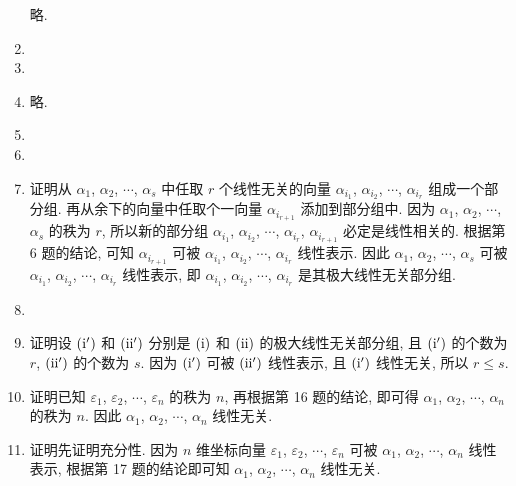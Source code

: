 \documentclass[a4paper, 11pt]{ctexart}
\begin{document}
\begin{enumerate}
            略.
        \item %
        \item %
        \item %
            略.
        \item %
        \item %
        \item %
            {\heiti 证明}\quad 从 $\alpha_1$, $\alpha_2$, $\cdots$, $\alpha_s$ 中任取 $r$ 个线性无关的向量 $\alpha_{i_1}$, $\alpha_{i_2}$, $\cdots$, $\alpha_{i_r}$ 组成一个部分组.
            再从余下的向量中任取个一向量 $\alpha_{i_{r+1}}$ 添加到部分组中. 因为 $\alpha_1$, $\alpha_2$, $\cdots$, $\alpha_s$ 的秩为 $r$, 所以新的部分组 $\alpha_{i_1}$, $\alpha_{i_2}$, $\cdots$, $\alpha_{i_r}$, $\alpha_{i_{r+1}}$ 必定是线性相关的.
            根据{\heiti 第 6 题}的结论, 可知 $\alpha_{i_{r+1}}$ 可被 $\alpha_{i_1}$, $\alpha_{i_2}$, $\cdots$, $\alpha_{i_r}$ 线性表示.
            因此 $\alpha_1$, $\alpha_2$, $\cdots$, $\alpha_s$ 可被 $\alpha_{i_1}$, $\alpha_{i_2}$, $\cdots$, $\alpha_{i_r}$ 线性表示, 即 $\alpha_{i_1}$, $\alpha_{i_2}$, $\cdots$, $\alpha_{i_r}$ 是其极大线性无关部分组.
        \item %
        \item %
            {\heiti 证明}\quad 设 $(\mathrm{\uppercase\expandafter{\romannumeral1'}})$ 和 $(\mathrm{\uppercase\expandafter{\romannumeral2'}})$ 分别是 $(\mathrm{\uppercase\expandafter{\romannumeral1}})$ 和 $(\mathrm{\uppercase\expandafter{\romannumeral2}})$ 的极大线性无关部分组, 且 $(\mathrm{\uppercase\expandafter{\romannumeral1'}})$ 的个数为 $r$, $(\mathrm{\uppercase\expandafter{\romannumeral2'}})$ 的个数为 $s$.
            因为 $(\mathrm{\uppercase\expandafter{\romannumeral1'}})$ 可被 $(\mathrm{\uppercase\expandafter{\romannumeral2'}})$ 线性表示, 且 $(\mathrm{\uppercase\expandafter{\romannumeral1'}})$ 线性无关, 所以 $r \leqslant s$. 
        \item %
            {\heiti 证明}\quad 已知 $\varepsilon_1$, $\varepsilon_2$, $\cdots$, $\varepsilon_n$ 的秩为 $n$, 再根据{\heiti 第 16 题}的结论, 即可得 $\alpha_1$, $\alpha_2$, $\cdots$, $\alpha_n$ 的秩为 $n$.
            因此 $\alpha_1$, $\alpha_2$, $\cdots$, $\alpha_n$ 线性无关.
        \item %
            {\heiti 证明}\quad 先证明充分性. 因为 $n$ 维坐标向量 $\varepsilon_1$, $\varepsilon_2$, $\cdots$, $\varepsilon_n$ 可被 $\alpha_1$, $\alpha_2$, $\cdots$, $\alpha_n$ 线性表示, 根据{\heiti 第 17 题}的结论即可知 $\alpha_1$, $\alpha_2$, $\cdots$, $\alpha_n$ 线性无关.
            

\end{enumerate}
\end{document}
